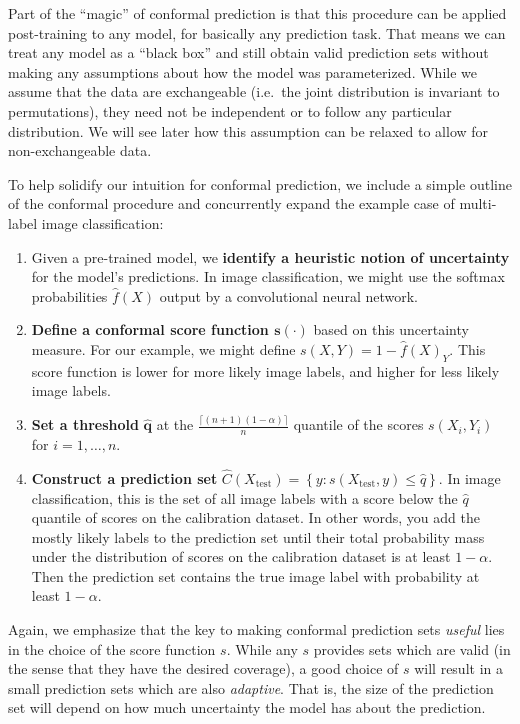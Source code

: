 \documentclass[a4paper, 12pt]{article}
\begin{document}
Part of the ``magic'' of conformal prediction is that this procedure can be applied
post-training to any model, for basically any prediction task. That means we can treat any
model as a ``black box'' and still obtain valid prediction sets without making any assumptions
about how the model was parameterized. While we assume that the data are exchangeable (i.e.\ the joint distribution is invariant to permutations),
they need not be independent or to follow any particular distribution. We will see later
how this assumption can be relaxed to allow for non-exchangeable data.

To help solidify our intuition for conformal prediction, we include a simple outline of the conformal
procedure and concurrently expand the example case of
multi-label image classification:
\begin{enumerate}
    \item Given a pre-trained model, we \textbf{identify a heuristic notion of uncertainty} for the model's predictions. In image classification, we might use the softmax probabilities $\hat{f}(X)$ output by a convolutional neural network.
    \item \textbf{Define a conformal score function $\bm{s(\cdot)}$} based on this uncertainty measure. For our example, we might define $s(X, Y)=1-\hat{f}(X)_Y$. This score function is lower for more likely image labels, and higher for less likely image labels.
    \item \textbf{Set a threshold} $\bm{\hat{q}}$ at the $ \frac{\lceil (n+1)(1-\alpha) \rceil }{n}$ quantile of the scores $s(X_i, Y_i)$ for $i = 1, \ldots, n$.
    \item \textbf{Construct a prediction set} $\hat{C}(X_{\text{test}}) = \left\{ y: s(X_{\text{test}}, y) \leq \hat{q} \right\}$.
          In image classification, this is the set of all image labels with a score below the $\hat{q}$ quantile of scores on the calibration dataset. In other words,
          you add the mostly likely labels to the prediction set until their total probability mass under the distribution of scores on the calibration dataset is at least $1-\alpha$. Then
          the prediction set contains the true image label with probability at least $1-\alpha$.
\end{enumerate}
Again, we emphasize that the key to making conformal prediction sets \textit{useful}
lies in the choice of the score function $s$. While any $s$ provides sets which are valid
(in the sense that they have the desired coverage), a good choice of $s$ will result in a small prediction sets
which are also \textit{adaptive}. That is, the size of the prediction set will depend on how much uncertainty
the model has about the prediction.
\end{document}
